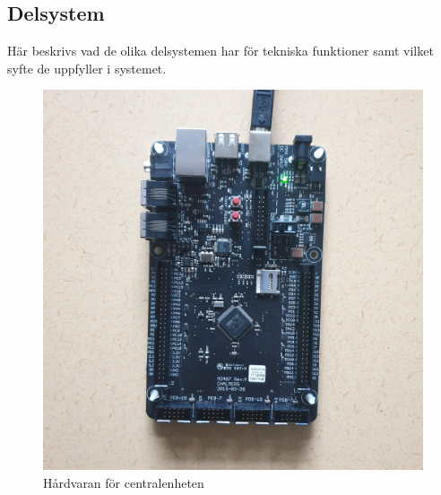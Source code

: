 \documentclass{article}
\begin{document}
\subsection{Delsystem}
Här beskrivs vad de olika delsystemen har för tekniska funktioner samt vilket syfte de uppfyller i systemet.

\begin{figure}[h]
    \centering
    \includegraphics[scale=0.05]{Projektrapport/central.png}
    \caption {Hårdvaran för centralenheten}
    \label{fig:drawing}
\end{figure}
\end{document}
